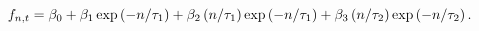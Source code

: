 \begin{equation} \label{eq:NSSfwd}
	\fInst = \betaLT + \betaST \loadSTnsFwd + \betaMTns \loadMTnsFwd
	+ \betaMTnss \loadMTnssFwd.
\end{equation}